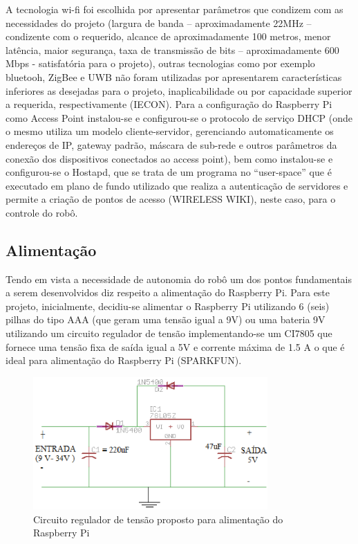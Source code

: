 A tecnologia wi-fi foi escolhida por apresentar parâmetros que condizem com as necessidades do projeto (largura de banda – aproximadamente
22MHz – condizente com o requerido, alcance de aproximadamente 100 metros, menor latência, maior segurança, taxa de transmissão de bits –
aproximadamente 600 Mbps - satisfatória para o projeto), outras tecnologias como por exemplo bluetooh, ZigBee e UWB não foram utilizadas
por apresentarem características inferiores as desejadas para o projeto, inaplicabilidade ou por capacidade superior a requerida,
respectivamente (IECON). Para a configuração do Raspberry Pi como Access Point instalou-se e configurou-se o protocolo de serviço DHCP
(onde o mesmo utiliza um modelo cliente-servidor, gerenciando automaticamente os endereços de IP, gateway padrão, máscara de sub-rede e
outros parâmetros da conexão dos dispositivos conectados ao access point), bem como instalou-se e configurou-se o Hostapd, que se trata
de um programa no “user-space” que é executado em plano de fundo utilizado que realiza a autenticação de servidores e permite a criação
de pontos de acesso (WIRELESS WIKI), neste caso, para o controle do robô. 

\subsection{Alimentação}

Tendo em vista a necessidade de autonomia do robô um dos pontos fundamentais a serem desenvolvidos diz respeito a alimentação do
Raspberry Pi. Para este projeto, inicialmente, decidiu-se alimentar o Raspberry Pi utilizando 6 (seis) pilhas do tipo AAA (que geram
uma tensão igual a 9V) ou uma bateria 9V utilizando um circuito regulador de tensão implementando-se um CI7805 que fornece uma tensão
fixa de saída igual a 5V e corrente máxima de 1.5 A o que é ideal para alimentação do Raspberry Pi (SPARKFUN).

\begin{figure}[H]
    \centering
    \includegraphics[width=0.8\textwidth]{figuras/esquematico_regulador.eps}
    \caption{Circuito regulador de tensão proposto para alimentação do Raspberry Pi}
    \label{fig:esquematico_regulador}
\end{figure}

